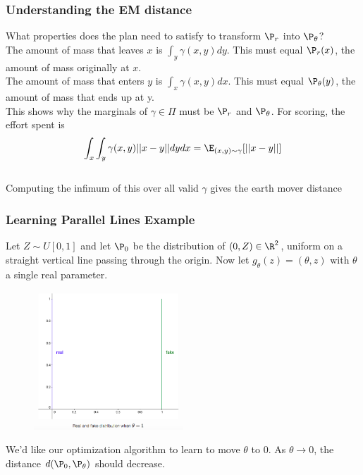 \documentclass{beamer}
\begin{document}
\begin{frame}
\frametitle{Understanding the EM distance}

\pause
What properties does the plan need to satisfy to transform $\P_{r}$ into $\P_{\theta}$? \\
\vspace{0.12in}
\pause
The amount of mass that leaves $x$ is $\int_{y} \gamma(x,y) dy$. This must equal $\P_{r}(x)$, the amount of mass originally at $x$.\\
\vspace{0.12in}
\pause
The amount of mass that enters $y$ is $\int_{x} \gamma(x,y) dx$. This must equal $\P_{\theta}(y)$, the amount of mass that ends up at y.\\
\vspace{0.12in}
\pause
This shows why the marginals of $\gamma \in \Pi$ must be $\P_{r}$ and $\P_{\theta}$. For scoring, the effort spent is $$\int_{x} \int_{y} \gamma(x,y) ||x-y|| dydx = \E_{(x,y) \sim \gamma} [ ||x-y|| ]$$\\
\vspace{0.12in}
\pause
Computing the infimum of this over all valid $\gamma$ gives the earth mover distance
\end{frame}


\begin{frame}
\frametitle{Learning Parallel Lines Example}
\pause
Let $Z \sim U[0,1]$ and let $\P_{0}$ be the distribution of $(0,Z) \in \R^2$, uniform on a straight vertical line passing through the origin. Now let $g_{\theta}(z) = (\theta,z)$ with $\theta$ a single real parameter.
\pause
\begin{figure}
\centering
\includegraphics[width=0.5\textwidth]{parallel_lines.png}
\end{figure}

\pause
We'd like our optimization algorithm to learn to move $\theta$ to $0$. As $\theta \to 0$, the distance $d(\P_{0},\P_{\theta})$ should decrease.

\end{frame}
\end{document}

